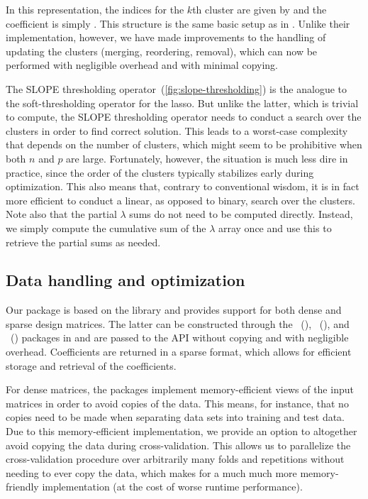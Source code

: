 \documentclass[article]{jss}
\begin{document}
In this representation, the indices for the \(k\)th cluster are given by  and the coefficient is simply .
This structure is the same basic setup as in \citet{larsson2023}. Unlike
their implementation, however, we have made improvements to the
handling of updating the clusters (merging,
reordering, removal), which can now be performed with negligible
overhead and with minimal copying.

The SLOPE thresholding operator~(\autoref{fig:slope-thresholding}) is the analogue
to the soft-thresholding operator for the lasso. But unlike the latter, which
is trivial to compute, the SLOPE thresholding operator needs to conduct a
search over the clusters in order to find correct solution. This leads to a
worst-case complexity that depends on the number of clusters, which might seem
to be prohibitive when both \(n\) and \(p\) are large. Fortunately, however,
the situation is much less dire in practice, since the order of the clusters
typically stabilizes early during optimization. This also means that, contrary
to conventional wisdom, it is in fact more efficient to conduct a linear, as opposed
to binary, search over the clusters. Note also that the partial \(\lambda\) sums
do not need to be computed directly. Instead, we simply compute the
cumulative sum of the \(\lambda\) array once and use this to retrieve
the partial sums as needed.

\subsection{Data handling and optimization}

Our package is based on the   library and provides
support for both dense and sparse design matrices. The latter can be
constructed through the ~(),
~(), and ~()
packages in and are passed to the  API without copying
and with negligible overhead. Coefficients are returned in a sparse format, which
allows for efficient storage and retrieval of the coefficients.

For dense matrices, the packages implement memory-efficient views of the input
matrices in order to avoid copies of the data. This means, for instance, that
no copies need to be made when separating data sets into training and test
data. Due to this memory-efficient implementation, we provide an option to
altogether avoid copying the data during cross-validation. This allows us to
parallelize the cross-validation procedure over arbitrarily many folds and
repetitions without needing to ever copy the data, which makes for a much
much more memory-friendly implementation (at the cost of
worse runtime performance).
\end{document}
